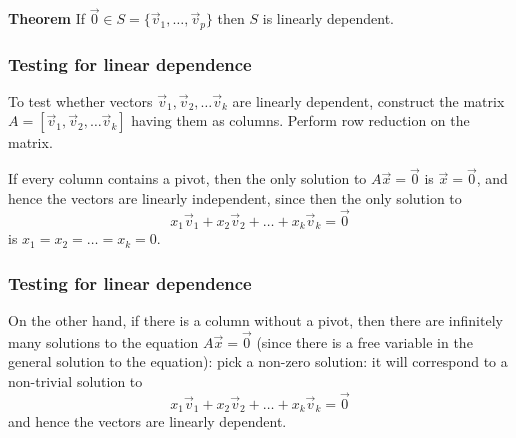   \begin{frame}[fragile]
\textbf{Theorem}
 If $\vec{0} \in S = \{ \vec{v}_1, \dots , \vec{v}_p \}$ 
 then $S$ is linearly dependent.

%
%
%
%
\end{frame}

  \begin{frame}[fragile]\frametitle{Testing for linear dependence}
To test whether vectors $\vec{v}_1, \vec{v}_2, \dots \vec{v}_k$ are linearly 
dependent, construct the matrix $A=[\vec{v}_1, \vec{v}_2, \dots \vec{v}_k]$ having them as columns.  
Perform row reduction on the matrix.

If every column contains a pivot, then the only solution to $A \vec{x} = \vec{0}$
is $\vec{x}=\vec{0}$, and hence the vectors are linearly independent, since then
the only solution to 
\[
 x_1 \vec{v}_1 + x_2 \vec{v}_2  + \dots + x_k \vec{v}_k = \vec{0}
\]
is $x_1=x_2=\dots=x_k=0$.
\end{frame}

  \begin{frame}[fragile]\frametitle{Testing for linear dependence}
On the other hand, if there is a column without a pivot, then there are infinitely many 
solutions to the equation $A \vec{x} = \vec{0}$ (since there is a free 
variable in the general solution to the equation): pick a non-zero solution: it 
will correspond to a non-trivial solution to
\[
 x_1 \vec{v}_1 + x_2 \vec{v}_2  + \dots + x_k \vec{v}_k = \vec{0}
\]
and hence the vectors are linearly dependent.
\end{frame}

